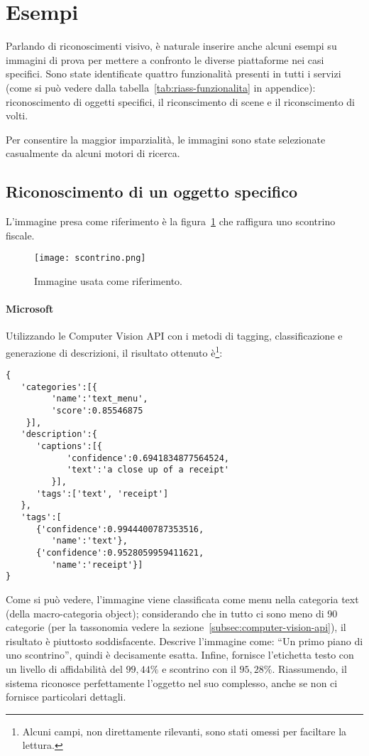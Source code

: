 
\section{Esempi}\label{sec:esempi}
Parlando di riconoscimenti visivo, è naturale inserire anche alcuni esempi su immagini di prova per mettere a confronto
le diverse piattaforme nei casi specifici.
Sono state identificate quattro funzionalità presenti in tutti i servizi (come si può vedere dalla tabella~\ref{tab:riass-funzionalita} in appendice):
riconoscimento di oggetti specifici, il riconscimento di scene e il riconscimento di volti.

Per consentire la maggior imparzialità, le immagini sono state selezionate casualmente da alcuni motori di ricerca.
%
\subsection{Riconoscimento di un oggetto specifico}\label{subsec:riconscimento-oggetto-specifico}
L'immagine presa come riferimento è la figura~\ref{fig:scontrino} che raffigura uno scontrino fiscale.
\begin{figure}[!h]
\begin{center}
	\texttt{[image: scontrino.png]}
{\scriptsize \caption{Immagine usata come riferimento.}
\label{fig:scontrino}}
\end{center}
\end{figure}
%
\paragraph{Microsoft} Utilizzando le Computer Vision API con i metodi di tagging, classificazione e generazione di descrizioni,
il risultato ottenuto è\footnote{Alcuni campi, non direttamente rilevanti, sono stati omessi per faciltare la lettura.}:
%
\begin{lstlisting}[style=myJSON, caption=Risultato dell'interrogazione con le Computer Vision API., label=lst:risultati-microsoft-scontrino]
{
   'categories':[{
         'name':'text_menu',
         'score':0.85546875
    }],
   'description':{
      'captions':[{
            'confidence':0.6941834877564524,
            'text':'a close up of a receipt'
         }],
      'tags':['text', 'receipt']
   },
   'tags':[
      {'confidence':0.9944400787353516,
         'name':'text'},
      {'confidence':0.9528059959411621,
         'name':'receipt'}]
}
\end{lstlisting}
%
Come si può vedere, l'immagine viene classificata come \textsf{menu} nella categoria \textsf{text} (della macro-categoria \textsf{object});
considerando che in tutto ci sono meno di 90 categorie (per la tassonomia vedere la sezione~\ref{subsec:computer-vision-api}), il risultato è piuttosto soddisfacente.
Descrive l'immagine come: ``Un primo piano di uno scontrino'', quindi è decisamente esatta.
Infine, fornisce l'etichetta \textsf{testo} con un livello di affidabilità del $99,44\%$ e \textsf{scontrino} con il $95,28\%$.
Riassumendo, il sistema riconosce perfettamente l'oggetto nel suo complesso, anche se non ci fornisce particolari dettagli.
